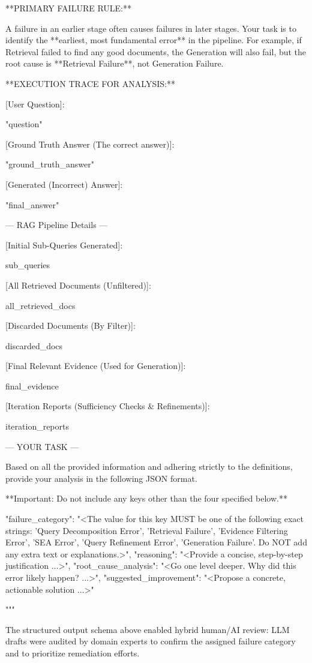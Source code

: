 \documentclass[11pt]{article}
\begin{document}
\begin{PromptBlock}
**PRIMARY FAILURE RULE:**

A failure in an earlier stage often causes failures in later stages. Your task is to identify the **earliest, most fundamental error** in the pipeline. For example, if Retrieval failed to find any good documents, the Generation will also fail, but the root cause is **Retrieval Failure**, not Generation Failure.

**EXECUTION TRACE FOR ANALYSIS:**

[User Question]:

"{question}"

[Ground Truth Answer (The correct answer)]:

"{ground_truth_answer}"

[Generated (Incorrect) Answer]:

"{final_answer}"

--- RAG Pipeline Details ---

[Initial Sub-Queries Generated]:

{sub_queries}

[All Retrieved Documents (Unfiltered)]:

{all_retrieved_docs}

[Discarded Documents (By Filter)]:

{discarded_docs}

[Final Relevant Evidence (Used for Generation)]:

{final_evidence}

[Iteration Reports (Sufficiency Checks & Refinements)]:

{iteration_reports}

--- YOUR TASK ---

Based on all the provided information and adhering strictly to the definitions, provide your analysis in the following JSON format.

**Important: Do not include any keys other than the four specified below.**

{
  "failure_category": "<The value for this key MUST be one of the following exact strings: 'Query Decomposition Error', 'Retrieval Failure', 'Evidence Filtering Error', 'SEA Error', 'Query Refinement Error', 'Generation Failure'. Do NOT add any extra text or explanations.>",
  "reasoning": "<Provide a concise, step-by-step justification ...>",
  "root_cause_analysis": "<Go one level deeper. Why did this error likely happen? ...>",
  "suggested_improvement": "<Propose a concrete, actionable solution ...>"
}

"""
\end{PromptBlock}

The structured output schema above enabled hybrid human/AI review: LLM drafts were audited by domain experts to confirm the assigned failure category and to prioritize remediation efforts.
\end{document}
